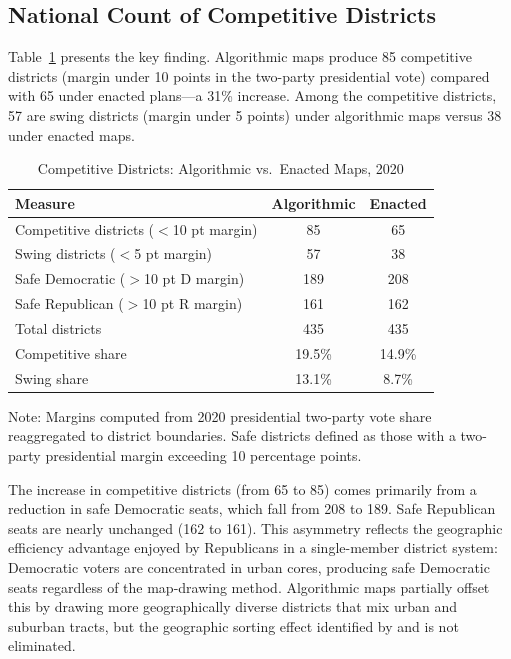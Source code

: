 \label{sec:results}

\subsection{National Count of Competitive Districts}

Table~\ref{tab:competitive-national} presents the key finding.  Algorithmic
maps produce 85 competitive districts (margin under 10 points in the two-party
presidential vote) compared with 65 under enacted plans---a 31\% increase.
Among the competitive districts, 57 are swing districts (margin under 5
points) under algorithmic maps versus 38 under enacted maps.

\begin{table}[h]
\centering
\caption{Competitive Districts: Algorithmic vs.\ Enacted Maps, 2020}
\label{tab:competitive-national}
\begin{threeparttable}
\begin{tabular}{lcc}
\toprule
Measure & Algorithmic & Enacted \\
\midrule
Competitive districts ($<$10 pt margin) & 85 & 65 \\
Swing districts ($<$5 pt margin) & 57 & 38 \\
Safe Democratic ($>$10 pt D margin) & 189 & 208 \\
Safe Republican ($>$10 pt R margin) & 161 & 162 \\
\midrule
Total districts & 435 & 435 \\
\midrule
Competitive share & 19.5\% & 14.9\% \\
Swing share & 13.1\% & 8.7\% \\
\bottomrule
\end{tabular}
\begin{tablenotes}
\small
\item Note: Margins computed from 2020 presidential two-party vote share
  reaggregated to district boundaries.  Safe districts defined as those with
  a two-party presidential margin exceeding 10 percentage points.
\end{tablenotes}
\end{threeparttable}
\end{table}

The increase in competitive districts (from 65 to 85) comes primarily from
a reduction in safe Democratic seats, which fall from 208 to 189.  Safe
Republican seats are nearly unchanged (162 to 161).  This asymmetry reflects
the geographic efficiency advantage enjoyed by Republicans in a single-member
district system: Democratic voters are concentrated in urban cores, producing
safe Democratic seats regardless of the map-drawing method.  Algorithmic maps
partially offset this by drawing more geographically diverse districts that
mix urban and suburban tracts, but the geographic sorting effect identified
by \citet{chen2013unintentional} and \citet{rodden2019why} is not eliminated.

